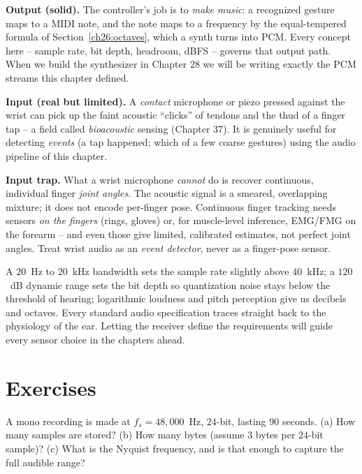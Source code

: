 \begin{goalbox}


\textbf{Output (solid).} The controller's job is to \emph{make music}: a recognized gesture maps
to a MIDI note, and the note maps to a frequency by the equal-tempered formula of
Section~\ref{ch26:octaves}, which a synth turns into PCM. Every concept here -- sample rate, bit
depth, headroom, dBFS -- governs that output path. When we build the synthesizer in Chapter 28 we
will be writing exactly the PCM streams this chapter defined.

\textbf{Input (real but limited).} A \emph{contact} microphone or piezo pressed against the wrist
can pick up the faint acoustic ``clicks'' of tendons and the thud of a finger tap -- a field
called \emph{bioacoustic} sensing (Chapter 37). It is genuinely useful for detecting \emph{events}
(a tap happened; which of a few coarse gestures) using the audio pipeline of this chapter.

\textbf{Input trap.} What a wrist microphone \emph{cannot} do is recover continuous, individual
finger \emph{joint angles}. The acoustic signal is a smeared, overlapping mixture; it does not
encode per-finger pose. Continuous finger tracking needs sensors \emph{on the fingers} (rings,
gloves) or, for muscle-level inference, EMG/FMG on the forearm -- and even those give limited,
calibrated estimates, not perfect joint angles. Treat wrist audio as an \emph{event detector},
never as a finger-pose sensor.
\end{goalbox}

\begin{aestheticbox}
A $20$~Hz to $20$~kHz bandwidth sets the sample rate slightly above $40$~kHz; a $120$~dB
dynamic range sets the bit depth so quantization noise stays below the threshold of hearing;
logarithmic loudness and pitch perception give us decibels and octaves. Every standard audio
specification traces straight back to the physiology of the ear. Letting the receiver
define the requirements will guide every sensor choice in the chapters ahead.
\end{aestheticbox}

\section{Exercises}
\label{ch26:exercises}

\begin{exercise}
A mono recording is made at $f_s = 48{,}000$~Hz, $24$-bit, lasting $90$ seconds. (a) How many
samples are stored? (b) How many bytes (assume $3$ bytes per $24$-bit sample)? (c) What is the
Nyquist frequency, and is that enough to capture the full audible range?
\end{exercise}

